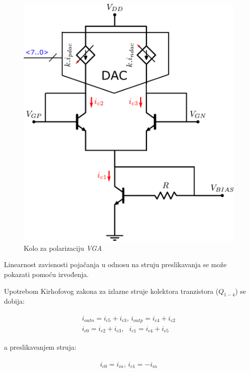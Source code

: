 \documentclass[journal,twocolumn,letterpaper]{IEEEJERM}
\begin{document}
\begin{figure}[!htbp]
  \centering
  \includegraphics[width=\linewidth]{vga_bias.pdf}
  \caption{Kolo za polarizaciju \textit{VGA}}
  \label{fig:vga_bias}
\end{figure}

Linearnost zavisnosti pojačanja u odnosu na struju preslikavanja se može pokazati pomoću izvođenja.

Upotrebom Kirhofovog zakona za izlazne struje kolektora tranzistora ($Q_{1-4}$) se dobija:

\begin{align}
  \label{eqn:kcl}
  \begin{split}
   i_{outn} = i_{c5} + i_{c3}, \,
   i_{outp} = i_{c4} + i_{c2} \\
   i_{c0} = i_{c2} + i_{c3}, \, \, \, \,
   i_{c1} = i_{c4} + i_{c5} 
  \end{split}
\end{align}

a preslikavanjem struja:

\begin{align}
  \label{eqn:mirror}
  \begin{split}
     i_{c0} = i_{in}, \,
     i_{c1} = -i_{in}
  \end{split}
\end{align}
\end{document}
